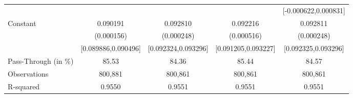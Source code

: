 {\begin{tabular}{l*{4}{c}}
                    &                     &                     &                     &[-0.000622,0.000831]         \\
Constant            &    0.090191\sym{***}&    0.092810\sym{***}&    0.092216\sym{***}&    0.092811\sym{***}\\
                    &  (0.000156)         &  (0.000248)         &  (0.000516)         &  (0.000248)         \\
                    &[0.089886,0.090496]         &[0.092324,0.093296]         &[0.091205,0.093227]         &[0.092325,0.093296]         \\
\midrule
Pass-Through (in \%)&       85.53         &       84.36         &       85.44         &       84.57         \\
Observations        &     800,881         &     800,861         &     800,861         &     800,861         \\
R-squared           &      0.9550         &      0.9551         &      0.9551         &      0.9551         \\
\bottomrule
\end{tabular}
}
